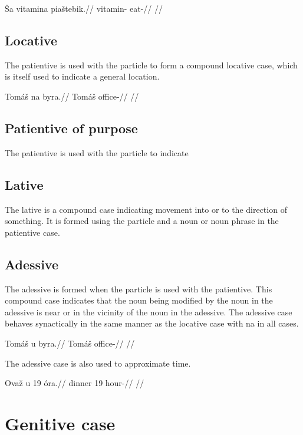 \pex
\begingl
\gla \v{S}a vitamina pia\v{s}tebik.//
\glb {} vitamin- eat-//
\glft {}//
\endgl
\xe

\subsection{Locative}

The patientive is used with the particle  to form a compound locative case, which is itself used to indicate a general location.

\pex
\begingl
\gla Tom\'a\v{s} na byra.//
\glb Tom\'a\v{s}  office-//
\glft {}//
\endgl
\xe

\subsection{Patientive of purpose}

The patientive is used with the particle  to indicate

\subsection{Lative}
The lative is a compound case indicating movement into or to the direction of something. It is formed using the particle  and a noun or noun phrase in the patientive case.

\subsection{Adessive}
The adessive is formed when the particle  is used with the patientive. This compound case indicates that the noun being modified by the noun in the adessive is near or in the vicinity of the noun in the adessive. The adessive case behaves synactically in the same manner as the locative case with na in all cases.

\pex
\begingl
\gla Tom\'a\v{s} u byra.//
\glb Tom\'a\v{s}  office-//
\glft {}//
\endgl
\xe

The adessive case is also used to approximate time.

\pex
\begingl
\gla Ova\v{z} u 19 \'ora.//
\glb dinner  19 hour-//
\glft {}//
\endgl
\xe

\section{Genitive case}

